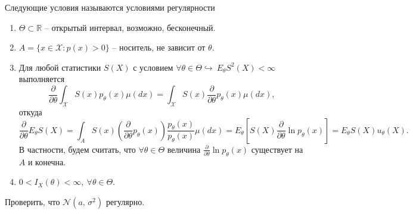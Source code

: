 \begin{definition}
Следующие условия называются условиями регулярности
\end{definition}
\begin{enumerate}
\item $\displaystyle \Theta \subset \mathbb{R}$ -- открытый интервал, возможно, бесконечный.
\item $\displaystyle A=\{x\in \mathcal{X} :p( x)  >0\}$ -- носитель, не зависит от $\displaystyle \theta $.
\item Для любой статистики $\displaystyle S( X)$ с условием $\displaystyle \forall \theta \in \Theta \hookrightarrow \ E_{\theta } S^{2}( X) < \infty $ выполняется
\begin{equation*}
\frac{\partial }{\partial \theta }\int _{\mathcal{X}} S( x) p_{\theta }( x) \mu ( dx) =\int _{\mathcal{X}} S( x)\frac{\partial }{\partial \theta } p_{\theta }( x) \mu ( dx),
\end{equation*}
откуда
\begin{equation*}
\frac{\partial }{\partial \theta } E_{\theta } S( X) =\int _{A} S( x)\left(\frac{\partial }{\partial \theta } p_{\theta }( x)\right)\frac{p_{\theta }( x)}{p_{\theta }( x)} \mu ( dx) =E_{\theta }\left[ S( X)\frac{\partial }{\partial \theta }\ln p_{\theta }( x)\right] =E_{\theta } S( X) u_{\theta }( X) .
\end{equation*}
В частности, будем считать, что $\displaystyle \forall \theta \in \Theta$ величина $\displaystyle \frac{\partial }{\partial \theta }\ln p_{\theta }( x)$ существует на $\displaystyle A$ и конечна.
\item $\displaystyle 0< I_{X}( \theta ) < \infty, \ \forall \theta \in \Theta $.
\end{enumerate}

\begin{exercise}
    Проверить, что $\displaystyle \mathcal{N}\left(a,\, \sigma ^{2}\right)$ регулярно.
\end{exercise}

